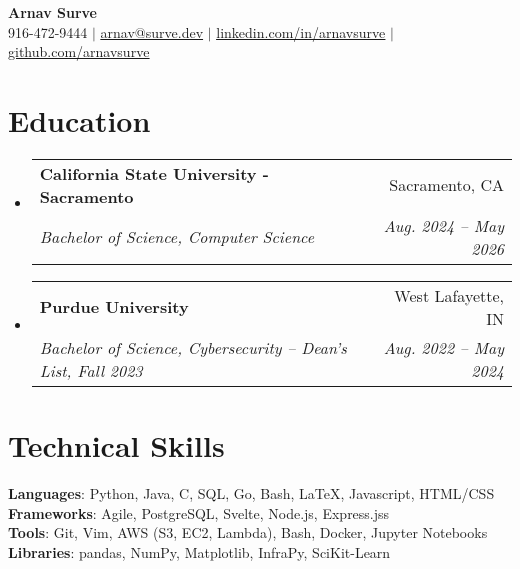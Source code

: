 \documentclass[letterpaper,11pt]{article}
\makeatletter
\newcommand{\resumeSubheading}[4]{
  \vspace{-2pt}\item
    \begin{tabular*}{0.97\textwidth}[t]{l@{\extracolsep{\fill}}r}
      \textbf{#1} & #2 \\
      \textit{\small#3} & \textit{\small #4} \\
    \end{tabular*}\vspace{-7pt}
}
\newcommand{\resumeSubHeadingListStart}{\begin{itemize}[leftmargin=0.15in, label={}]}
\newcommand{\resumeSubHeadingListEnd}{\end{itemize}}
\makeatother
\begin{document}

\begin{center}
    \textbf{\Huge Arnav Surve} \\ \vspace{1pt}
    \vspace{5pt}
    \small 916-472-9444 $|$ \href{mailto:arnav@surve.dev}{\underline{arnav@surve.dev}} $|$ 
    \href{https://linkedin.com/in/arnavsurve/}{\underline{linkedin.com/in/arnavsurve}} $|$
    \href{https://github.com/arnavsurve}{\underline{github.com/arnavsurve}}
\end{center}

\section{Education}
  \resumeSubHeadingListStart
    \resumeSubheading
      {California State University - Sacramento}{Sacramento, CA}
      {Bachelor of Science, Computer Science}{Aug. 2024 -- May 2026}
    \resumeSubheading
      {Purdue University}{West Lafayette, IN}
      {Bachelor of Science, Cybersecurity -- Dean's List, Fall 2023}{Aug. 2022 -- May 2024}
  \resumeSubHeadingListEnd

%
\section{Technical Skills}
 \begin{itemize}[leftmargin=0.15in, label={}]
    \small{\item{
     \textbf{Languages}{: Python, Java, C, SQL, Go, Bash, \LaTeX, Javascript, HTML/CSS} \\
     \textbf{Frameworks}{: Agile, PostgreSQL, Svelte, Node.js, Express.jss} \\
     \textbf{Tools}{: Git, Vim, AWS (S3, EC2, Lambda), Bash, Docker, Jupyter Notebooks} \\
     \textbf{Libraries}{: pandas, NumPy, Matplotlib, InfraPy, SciKit-Learn}
    }}
 \end{itemize}
\end{document}
